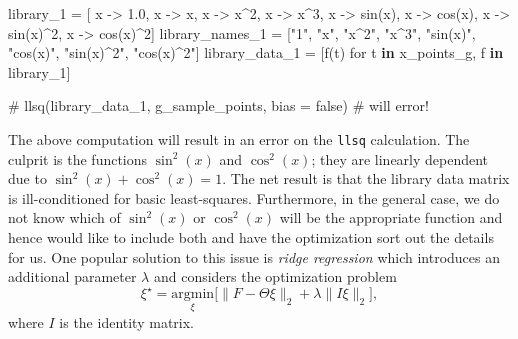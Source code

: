 \documentclass[
]{article}
\newenvironment{Shaded}{\begin{snugshade}}{\end{snugshade}}
\newcommand{\CommentTok}[1]{\textcolor[rgb]{0.37,0.37,0.37}{#1}}
\newcommand{\FloatTok}[1]{\textcolor[rgb]{0.68,0.00,0.00}{#1}}
\newcommand{\FunctionTok}[1]{\textcolor[rgb]{0.28,0.35,0.67}{#1}}
\newcommand{\KeywordTok}[1]{\textcolor[rgb]{0.00,0.23,0.31}{\textbf{#1}}}
\newcommand{\NormalTok}[1]{\textcolor[rgb]{0.00,0.23,0.31}{#1}}
\newcommand{\OperatorTok}[1]{\textcolor[rgb]{0.37,0.37,0.37}{#1}}
\newcommand{\StringTok}[1]{\textcolor[rgb]{0.13,0.47,0.30}{#1}}
\begin{document}
\begin{Shaded}
\begin{Highlighting}[]
\NormalTok{library\_1 }\OperatorTok{=}\NormalTok{ [}
\NormalTok{  x }\OperatorTok{{-}\textgreater{}} \FloatTok{1.0}\NormalTok{, x }\OperatorTok{{-}\textgreater{}}\NormalTok{ x, x }\OperatorTok{{-}\textgreater{}}\NormalTok{ x}\OperatorTok{\^{}}\FloatTok{2}\NormalTok{, x }\OperatorTok{{-}\textgreater{}}\NormalTok{ x}\OperatorTok{\^{}}\FloatTok{3}\NormalTok{, }
\NormalTok{  x }\OperatorTok{{-}\textgreater{}} \FunctionTok{sin}\NormalTok{(x), x }\OperatorTok{{-}\textgreater{}} \FunctionTok{cos}\NormalTok{(x), }
\NormalTok{  x }\OperatorTok{{-}\textgreater{}} \FunctionTok{sin}\NormalTok{(x)}\OperatorTok{\^{}}\FloatTok{2}\NormalTok{, x }\OperatorTok{{-}\textgreater{}} \FunctionTok{cos}\NormalTok{(x)}\OperatorTok{\^{}}\FloatTok{2}\NormalTok{]}
\NormalTok{library\_names\_1 }\OperatorTok{=}\NormalTok{ [}\StringTok{"1"}\NormalTok{, }\StringTok{"x"}\NormalTok{, }\StringTok{"x\^{}2"}\NormalTok{, }\StringTok{"x\^{}3"}\NormalTok{, }\StringTok{"sin(x)"}\NormalTok{, }\StringTok{"cos(x)"}\NormalTok{, }\StringTok{"sin(x)\^{}2"}\NormalTok{, }\StringTok{"cos(x)\^{}2"}\NormalTok{]}
\NormalTok{library\_data\_1 }\OperatorTok{=}\NormalTok{ [}\FunctionTok{f}\NormalTok{(t) for t }\KeywordTok{in}\NormalTok{ x\_points\_g, f }\KeywordTok{in}\NormalTok{ library\_1]}

\CommentTok{\# llsq(library\_data\_1, g\_sample\_points, bias = false) \# will error!}
\end{Highlighting}
\end{Shaded}

The above computation will result in an error on the \texttt{llsq}
calculation. The culprit is the functions \(\sin^2(x)\) and
\(\cos^2(x)\); they are linearly dependent due to
\(\sin^2(x) + \cos^2(x) = 1\). The net result is that the library data
matrix is ill-conditioned for basic least-squares. Furthermore, in the
general case, we do not know which of \(\sin^2(x)\) or \(\cos^2(x)\)
will be the appropriate function and hence would like to include both
and have the optimization sort out the details for us. One popular
solution to this issue is \emph{ridge regression} \cite{hoerl1970ridge}
which introduces an additional parameter \(\lambda\) and considers the
optimization problem \begin{equation}
\xi^\star = \underset{\xi}{\text{argmin}}\bigg[ \lVert F - \Theta \xi \rVert_{2} + \lambda \lVert I \xi \rVert_{2} \bigg],
\end{equation} where \(I\) is the identity matrix.
\end{document}

